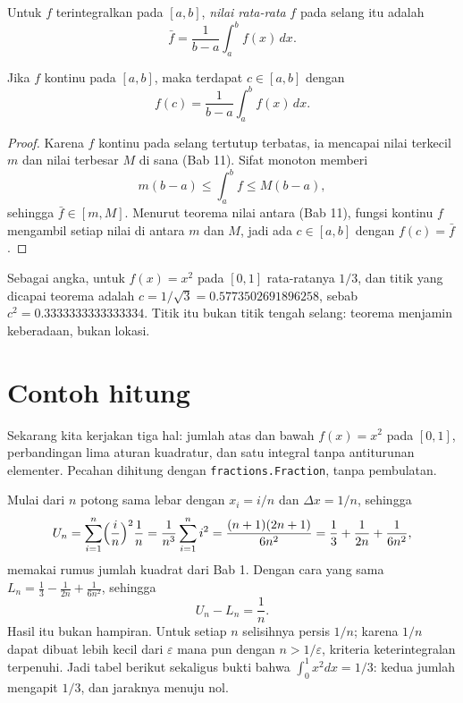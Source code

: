 \begin{definisi}
Untuk $f$ terintegralkan pada $[a,b]$, \emph{nilai rata-rata} $f$ pada selang itu
adalah
\[
\bar{f}=\frac{1}{b-a}\int_a^b f(x)\,dx .
\]
\end{definisi}

\begin{teorema}
Jika $f$ kontinu pada $[a,b]$, maka terdapat $c\in[a,b]$ dengan
\[
f(c)=\frac{1}{b-a}\int_a^b f(x)\,dx .
\]
\end{teorema}

\begin{proof}
Karena $f$ kontinu pada selang tertutup terbatas, ia mencapai nilai terkecil $m$ dan
nilai terbesar $M$ di sana (Bab 11). Sifat monoton memberi
\[
m(b-a)\le\int_a^b f\le M(b-a),
\]
sehingga $\bar{f}\in[m,M]$. Menurut teorema nilai antara (Bab 11), fungsi kontinu $f$
mengambil setiap nilai di antara $m$ dan $M$, jadi ada $c\in[a,b]$ dengan
$f(c)=\bar{f}$.
\end{proof}

Sebagai angka, untuk $f(x)=x^2$ pada $[0,1]$ rata-ratanya $1/3$, dan titik yang
dicapai teorema adalah $c=1/\sqrt3=0.5773502691896258$, sebab
$c^2=0.3333333333333334$. Titik itu bukan titik tengah selang: teorema menjamin
keberadaan, bukan lokasi.

\section{Contoh hitung}

Sekarang kita kerjakan tiga hal: jumlah atas dan bawah $f(x)=x^2$ pada $[0,1]$,
perbandingan lima aturan kuadratur, dan satu integral tanpa antiturunan elementer.
Pecahan dihitung dengan \texttt{fractions.Fraction}, tanpa pembulatan.

Mulai dari $n$ potong sama lebar dengan $x_i=i/n$ dan $\Delta x=1/n$, sehingga
\[
U_n=\sum_{i=1}^{n}\Bigl(\frac{i}{n}\Bigr)^2\frac1n=\frac{1}{n^3}\sum_{i=1}^{n}i^2
=\frac{(n+1)(2n+1)}{6n^2}=\frac13+\frac{1}{2n}+\frac{1}{6n^2},
\]
memakai rumus jumlah kuadrat dari Bab 1. Dengan cara yang sama
$L_n=\frac13-\frac{1}{2n}+\frac{1}{6n^2}$, sehingga
\begin{equation}
U_n-L_n=\frac1n .
\end{equation}
Hasil itu bukan hampiran. Untuk setiap $n$ selisihnya persis $1/n$; karena $1/n$ dapat
dibuat lebih kecil dari $\varepsilon$ mana pun dengan $n>1/\varepsilon$, kriteria
keterintegralan terpenuhi. Jadi tabel berikut sekaligus bukti bahwa
$\int_0^1x^2dx=1/3$: kedua jumlah mengapit $1/3$, dan jaraknya menuju nol.


